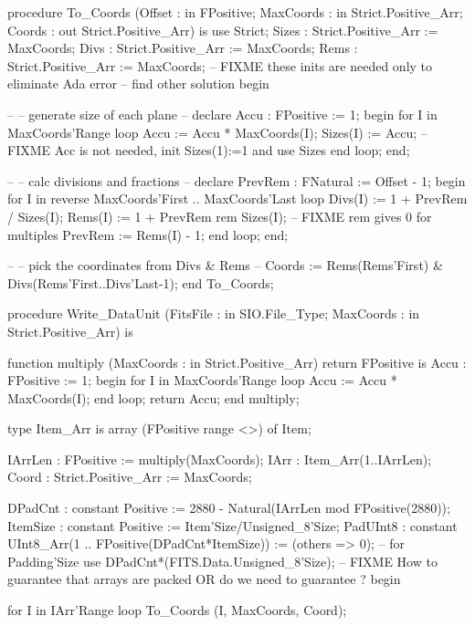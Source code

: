    procedure To_Coords (Offset    : in  FPositive;
                        MaxCoords : in  Strict.Positive_Arr;
                        Coords    : out Strict.Positive_Arr)
   is
	use Strict;
      Sizes : Strict.Positive_Arr := MaxCoords;
      Divs :  Strict.Positive_Arr := MaxCoords;
      Rems :  Strict.Positive_Arr := MaxCoords;
      -- FIXME these inits are needed only to eliminate Ada error
      -- find other solution
   begin

    --
    -- generate size of each plane
    --
    declare
      Accu  : FPositive := 1;
    begin
      for I in MaxCoords'Range
      loop
       Accu := Accu * MaxCoords(I);
       Sizes(I) := Accu;
       -- FIXME Acc is not needed, init Sizes(1):=1 and use Sizes
      end loop;
    end;

    --
    -- calc divisions and fractions
    --
    declare
      PrevRem : FNatural := Offset - 1;
    begin
      for I in reverse MaxCoords'First .. MaxCoords'Last
      loop
        Divs(I) := 1 + PrevRem  /  Sizes(I);
        Rems(I) := 1 + PrevRem rem Sizes(I);
          -- FIXME rem gives 0 for multiples
        PrevRem := Rems(I) - 1;
      end loop;
    end;

    --
    -- pick the coordinates from Divs & Rems
    --
    Coords := Rems(Rems'First) & Divs(Rems'First..Divs'Last-1);
   end To_Coords;


   procedure Write_DataUnit (FitsFile  : in  SIO.File_Type;
                             MaxCoords : in  Strict.Positive_Arr)
   is

     function  multiply (MaxCoords : in  Strict.Positive_Arr) return FPositive
     is
      Accu  : FPositive := 1;
     begin
      for I in MaxCoords'Range
      loop
       Accu := Accu * MaxCoords(I);
      end loop;
      return Accu;
     end multiply;

    type Item_Arr is array (FPositive range <>) of Item;

    IArrLen : FPositive := multiply(MaxCoords);
    IArr    : Item_Arr(1..IArrLen);
    Coord   : Strict.Positive_Arr := MaxCoords;

    DPadCnt  : constant Positive  := 2880 - Natural(IArrLen mod FPositive(2880));
    ItemSize : constant Positive := Item'Size/Unsigned_8'Size;
    PadUInt8 : constant UInt8_Arr(1 .. FPositive(DPadCnt*ItemSize)) := (others => 0);
--    for Padding'Size use DPadCnt*(FITS.Data.Unsigned_8'Size);
-- FIXME How to guarantee that arrays are packed OR do we need to guarantee ?
   begin

    for I in IArr'Range
    loop
     To_Coords (I, MaxCoords, Coord);

